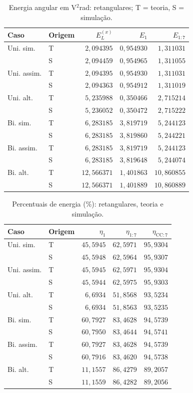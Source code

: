 \begin{table}[H]
\centering
\footnotesize\setlength{\tabcolsep}{3.5pt}
\caption{Energia angular em V$^2$rad: retangulares; T = teoria, S = simulação.}\label{tab:energia_abs4}
\begin{tabular}{llrrr}\hline
Caso & Origem & $E_L^{(x)}$ & $E_1$ & $E_{1:7}$ \\ \hline
Uni. sim. & T & $2{,}094395$ & $0{,}954930$ & $1{,}311031$ \\
 & S & $2{,}094459$ & $0{,}954965$ & $1{,}311055$ \\
Uni. assim. & T & $2{,}094395$ & $0{,}954930$ & $1{,}311031$ \\
 & S & $2{,}094363$ & $0{,}954912$ & $1{,}311019$ \\
Uni. alt. & T & $5{,}235988$ & $0{,}350466$ & $2{,}715214$ \\
 & S & $5{,}236052$ & $0{,}350472$ & $2{,}715222$ \\
Bi. sim. & T & $6{,}283185$ & $3{,}819719$ & $5{,}244123$ \\
 & S & $6{,}283185$ & $3{,}819860$ & $5{,}244221$ \\
Bi. assim. & T & $6{,}283185$ & $3{,}819719$ & $5{,}244123$ \\
 & S & $6{,}283185$ & $3{,}819648$ & $5{,}244074$ \\
Bi. alt. & T & $12{,}566371$ & $1{,}401863$ & $10{,}860855$ \\
 & S & $12{,}566371$ & $1{,}401889$ & $10{,}860889$ \\
\hline\end{tabular}
\end{table}
\begin{table}[H]
\centering
\footnotesize\setlength{\tabcolsep}{3.5pt}
\caption{Percentuais de energia (\%): retangulares, teoria e simulação.}\label{tab:energias_ret}
\begin{tabular}{llrrr}\hline
Caso & Origem & $\eta_1$ & $\eta_{1:7}$ & $\eta_{\mathrm{CC}:7}$ \\ \hline
Uni. sim. & T & $45{,}5945$ & $62{,}5971$ & $95{,}9304$ \\
 & S & $45{,}5948$ & $62{,}5964$ & $95{,}9307$ \\
Uni. assim. & T & $45{,}5945$ & $62{,}5971$ & $95{,}9304$ \\
 & S & $45{,}5944$ & $62{,}5975$ & $95{,}9303$ \\
Uni. alt. & T & $6{,}6934$ & $51{,}8568$ & $93{,}5234$ \\
 & S & $6{,}6934$ & $51{,}8563$ & $93{,}5235$ \\
Bi. sim. & T & $60{,}7927$ & $83{,}4628$ & $94{,}5739$ \\
 & S & $60{,}7950$ & $83{,}4644$ & $94{,}5741$ \\
Bi. assim. & T & $60{,}7927$ & $83{,}4628$ & $94{,}5739$ \\
 & S & $60{,}7916$ & $83{,}4620$ & $94{,}5738$ \\
Bi. alt. & T & $11{,}1557$ & $86{,}4279$ & $89{,}2057$ \\
 & S & $11{,}1559$ & $86{,}4282$ & $89{,}2056$ \\
\hline\end{tabular}
\end{table}
